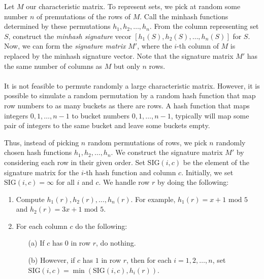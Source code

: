 Let $M$ our characteristic matrix. To represent sets, we pick at random some number $n$ of premutations of the rows of $M$. Call the minhash functions determined by these permutations $h_1, h_2, \dots, h_n$. From the column representing set $S$, construct the \textit{minhash signature} vecor $[h_1(S), h_2(S), \dots, h_n(S)]$ for $S$. Now, we can form the \textit{signature matrix} $M\prime$, where the $i$-th column of $M$ is replaced by the minhash signature vector. Note that the signature matrix $M\prime$ has the same number of columns as $M$ but only $n$ rows. 
\\
\\
It is not feasible to permute randomly a large characteristic matrix. However, it is possible to simulate a random permutation by a random hash function that map row numbers to as many buckets as there are rows. A hash function that maps integers $0, 1, \dots, n - 1$ to bucket numbers $0, 1, \dots, n - 1$, typically will map some pair of integers to the same bucket and leave some buckets empty.

Thus, instead of picking $n$ random permutations of rows, we pick $n$ randomly chosen hash functions $h_1, h_2, \dots, h_n$. We construct the signature matrix $M\prime$ by considering each row in their given order. Set $\text{SIG}(i, c)$ be the element of the signature matrix for the $i$-th hash function and column $c$. Initially, we set $\text{SIG}(i, c) = \infty$ for all $i$ and $c$. We handle row $r$ by doing the following:

\begin{enumerate}
    \item Compute $h_1(r), h_2(r), \dots, h_n(r)$. For example, $h_1(r) = x + 1 \text{ mod } 5$ and $h_2(r) = 3x + 1 \text{ mod } 5$.
    \item For each column $c$ do the following:
        \begin{itemize}
            \item[(a)] If $c$ has $0$ in row $r$, do nothing.
            \item[(b)] However, if $c$ has $1$ in row $r$, then for each $i = 1, 2, \dots, n$, set $\text{SIG}(i, c) = \min(\text{SIG}(i, c), h_i(r))$.
        \end{itemize}
\end{enumerate}

